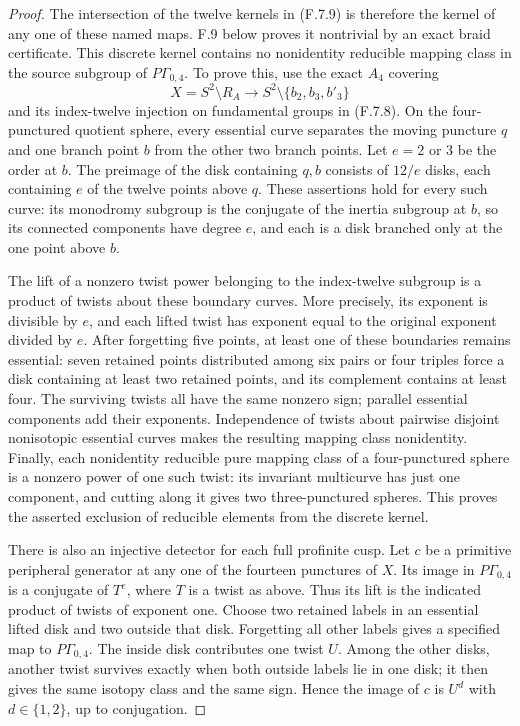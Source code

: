 \begin{proof}
The intersection of the twelve kernels in (F.7.9)
is therefore the kernel of any one of these named
maps.  F.9 below proves it nontrivial by an exact braid certificate.
This discrete kernel contains no nonidentity reducible
mapping class in the source subgroup of
$P\Gamma_{0,4}$.  To prove this, use the exact
$A_4$ covering
\[
 X=S^2\setminus R_A\longrightarrow
 S^2\setminus\{b_2,b_3,b'_3\}
\]
and its index-twelve injection on fundamental groups
in (F.7.8).  On the four-punctured quotient sphere,
every essential curve separates the moving puncture
$q$ and one branch point $b$ from the other two
branch points.  Let $e=2$ or $3$ be the order at $b$.
The preimage of the disk containing $q,b$ consists
of $12/e$ disks, each containing $e$ of the twelve
points above $q$.  These assertions hold for every
such curve: its monodromy subgroup is the conjugate
of the inertia subgroup at $b$, so its connected
components have degree $e$, and each is a disk
branched only at the one point above $b$.

The lift of a nonzero twist power belonging to the
index-twelve subgroup is a product of twists about
these boundary curves.  More precisely, its exponent
is divisible by $e$, and each lifted twist has exponent
equal to the original exponent divided by $e$.  After
forgetting five points, at least one of these boundaries
remains essential: seven retained points distributed
among six pairs or four triples force a disk containing
at least two retained points, and its complement
contains at least four.  The surviving twists all have
the same nonzero sign; parallel essential components
add their exponents.  Independence of twists about
pairwise disjoint nonisotopic essential curves makes
the resulting mapping class nonidentity.  Finally,
each nonidentity reducible pure mapping class of a
four-punctured sphere is a nonzero power of one such
twist: its invariant multicurve has just one component,
and cutting along it gives two three-punctured spheres.
This proves the asserted exclusion of reducible
elements from the discrete kernel.

There is also an injective detector for each full
profinite cusp.  Let $c$ be a primitive peripheral
generator at any one of the fourteen punctures of
$X$.  Its image in $P\Gamma_{0,4}$ is a conjugate
of $T^e$, where $T$ is a twist as above.  Thus its
lift is the indicated product of twists of exponent
one.  Choose two retained labels in an essential
lifted disk and two outside that disk.  Forgetting
all other labels gives a specified map to
$P\Gamma_{0,4}$.  The inside disk contributes one
twist $U$.  Among the other disks, another twist
survives exactly when both outside labels lie in
one disk; it then gives the same isotopy class and
the same sign.  Hence the image of $c$ is $U^d$
with $d\in\{1,2\}$, up to conjugation.


\end{proof}
